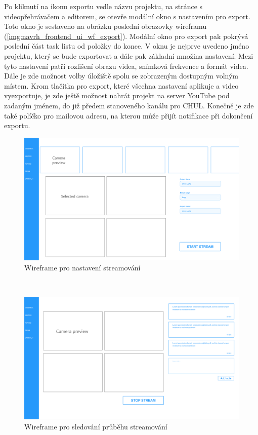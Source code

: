 \documentclass[thesis=M,czech]{FITthesis}[2012/06/26]
\begin{document}
	Po kliknutí na ikonu exportu vedle názvu projektu, na stránce s videopřehrávačem a editorem, se otevře modální okno s nastavením pro export. Toto okno je sestaveno na obrázku poslední obrazovky wireframu (\ref{img:navrh_frontend_ui_wf_export}). Modální okno pro export pak pokrývá poslední část task listu od položky  do konce. V oknu je nejprve uvedeno jméno projektu, který se bude exportovat a dále pak základní množina nastavení. Mezi tyto nastavení patří rozlišení obrazu videa, snímková frekvence a formát videa. Dále je zde možnost volby úložiště spolu se zobrazeným dostupným volným místem. Krom tlačítka pro export, které všechna nastavení aplikuje a video vyexportuje, je zde ještě možnost nahrát projekt na server YouTube pod zadaným jménem, do již předem stanoveného kanálu pro CHUL. Konečně je zde také políčko pro mailovou adresu, na kterou může přijít notifikace při dokončení exportu.
\\
\begin{figure}[h]\centering
	\includegraphics[width=1\textwidth]{images/ui_wf_ulab-config.eps}
	\caption{Wireframe pro nastavení streamování}\label{img:navrh_frontend_ui_wf_config}
\end{figure}
\\
\begin{figure}[h]\centering
	\includegraphics[width=1\textwidth]{images/ui_wf_ulab-stream.eps}
	\caption{Wireframe pro sledování průběhu streamování}\label{img:navrh_frontend_ui_wf_preview}
\end{figure}
\end{document}
